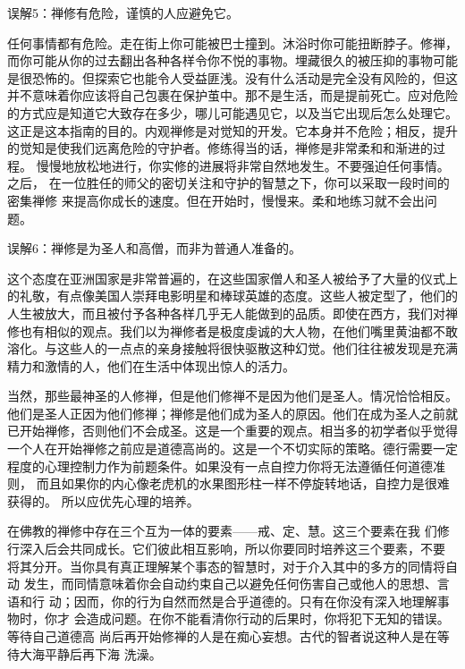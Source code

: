 \subsectnon 误解5：禅修有危险，谨慎的人应避免它。

任何事情都有危险。走在街上你可能被巴士撞到。沐浴时你可能扭断脖子。修禅，
而你可能从你的过去翻出各种各样令你不悦的事物。埋藏很久的被压抑的事物可能
是很恐怖的。但探索它也能令人受益匪浅。没有什么活动是完全没有风险的，但这
并不意味着你应该将自己包裹在保护茧中。那不是生活，而是提前死亡。应对危险
的方式应是知道它大致存在多少，哪儿可能遇见它，以及当它出现后\1怎么处理它。
这正是这本指南的目的。内观禅修是对觉知的开发。它本身并不危险；相反，提升
的觉知是使我们远离危险的守护者。修练得当的话，禅修是非常柔和和渐进的过程。
慢慢地放松地进行，你实修的进展将非常自然地发生。不要强迫任何事情。之后，
在一位胜任的师父的密切关注和守护的智慧之下，你可以采取一段时间的密集禅修
来提高你成长的速度。但在开始时，慢慢来。柔和地练习就不会出问题。

\subsectnon 误解6：禅修是为圣人和高僧，而非为普通人准备的。

这个态度在亚洲国家是非常普遍的，在这些国家僧人和圣人被给予了大量的仪式上
的礼敬，有点像美国人崇拜电影明星和棒球英雄的态度。这些人被定型了，他们的
人生被放大，而且被付予各种各样几乎无人能做到的品质。即使在西方，我们对禅
修也有相似的观点。我们以为禅修者是极度虔诚的大人物，在他们嘴里黄油都不敢
溶化。与这些人的一点点的亲身接触将很快驱散这种幻觉。他们往往被发现是充满
精力和激情的人，他们在生活中体现出惊人的活力。

当然，那些最神圣的人修禅，但是他们修禅不是因为他们是圣人。情况恰恰相反。
他们是圣人正因为他们修禅；禅修是他们成为圣人的原因。他们在成为圣人之前就
已开始禅修，否则他们不会成圣。这是一个重要的观点。相当多的初学者似乎觉得
一个人在开始禅修之前应是道德高尚的。这是一个不切实际的策略。德行需要一定
程度的心理控制力作为前题条件。如果没有一点自控力你将无法遵循任何道德准则，
而且如果你的内心像老虎机的水果图形柱一样不停旋转地话，自控力是很难获得的。
所以应优先心理的培养。

在佛教的禅修中存在三个互为一体的要素——戒、定、慧。这三个要素在我
们修行深入后会共同成长。它们彼此相互影响，所以你要同时培养这三个要素，不要
将其分开。当你具有真正理解某个事态的智慧时，对于介入其中的多方的同情将自动
发生，而同情意味着你会自动约束自己以避免任何伤害自己或他人的思想、言语和行
动；因而，你的行为自然而然是合乎道德的。只有在你没有深入地理解事物时，你才
会造成问题。在你不能看清你行动的后果时，你将犯下无知的错误。等待自己道德高
尚后再开始修禅的人是在痴心妄想。古代的智者说这种人是在等待大海平静后再下海
洗澡。

\endchapter

\byebye
